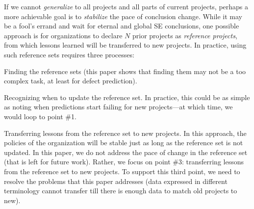 If we cannot {\em generalize} to all projects and all parts
of current projects, perhaps a more achievable goal is to {\em stabilize} the pace of conclusion change. 
While it may be 
a fool's errand  and wait for  eternal and global SE
conclusions, one possible approach is for organizations
to declare $N$ prior projects as {\em reference projects},
from which lessons learned will be transferred to new projects.
In practice, using such reference sets requires three processes:
\squishlist

\item Finding the reference sets (this paper shows that finding
  them may not be a too complex task, at least for defect prediction).
  \item Recognizing when to update  the reference set. In practice,
  this could be as simple as noting when predictions start failing for new projects---at which time, we would loop to point \#1.
\item Transferring
  lessons from the reference set to new projects.  
\squishend
In this approach, the policies of the organization will be
stable just as long as the reference set is not updated.
In this paper, we do not address the pace of change in the reference set
(that is left for future work).
Rather, we focus on point \#3: transferring lessons from
the reference set to new projects. To support this third point,
we need to resolve the problems
  that this paper addresses (data expressed in different terminology
  cannot transfer till there is enough data to match old projects to new).

  

